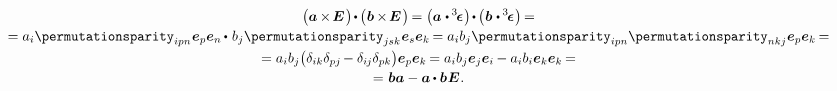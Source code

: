 \vspace{-1.1em}\begin{multline}\label{vectorcrossidentitydotvectorcrossidentity}
\bigl( \bm{a} \hspace{-0.1ex}\times\hspace{-0.25ex} \UnitDyad \hspace{.2ex}\bigr) \hspace{-0.25ex} \dotp \hspace{-0.15ex} \bigl(\hspace{.1ex} \bm{b} \hspace{-0.1ex}\times\hspace{-0.25ex} \UnitDyad \hspace{.2ex}\bigr) \hspace{-0.2ex}
= \bigl( \bm{a} \hspace{.1ex} \dotp \hspace{-0.1ex} \permutationsparitytensor \hspace{.1ex}\bigr) \hspace{-0.25ex} \dotp \hspace{-0.15ex} \bigl(\hspace{.1ex} \bm{b} \hspace{.1ex} \dotp \hspace{-0.1ex} \permutationsparitytensor \hspace{.1ex}\bigr) \hspace{-0.2ex} =
\\[-0.1em]
%
= a_i \permutationsparity_{ipn} \hspace{.1ex} \bm{e}_p \bm{e}_n \hspace{-0.15ex} \dotp \hspace{.2ex} b_j \permutationsparity_{jsk} \hspace{.1ex} \bm{e}_s \bm{e}_k \hspace{-0.2ex}
= a_i b_j \permutationsparity_{ipn} \permutationsparity_{nkj} \hspace{.05ex} \bm{e}_p \bm{e}_k \hspace{-0.2ex} =
\\[-0.1em]
%
= a_i b_j \bigl( \delta_{ik} \delta_{pj} \hspace{-0.22ex} - \delta_{i\hspace{-0.1ex}j} \delta_{pk} \bigr) \bm{e}_p \bm{e}_k \hspace{-0.2ex}
= a_i b_j \bm{e}_j \bm{e}_i \hspace{-0.12ex} - a_i b_i \bm{e}_k \bm{e}_k \hspace{-0.2ex} =
\\[-0.1em]
%
= \hspace{.1ex} \bm{b} \bm{a} - \bm{a} \hspace{-0.1ex} \dotp \bm{b} \hspace{.1ex} \UnitDyad
\hspace{.1ex} .
\end{multline}

